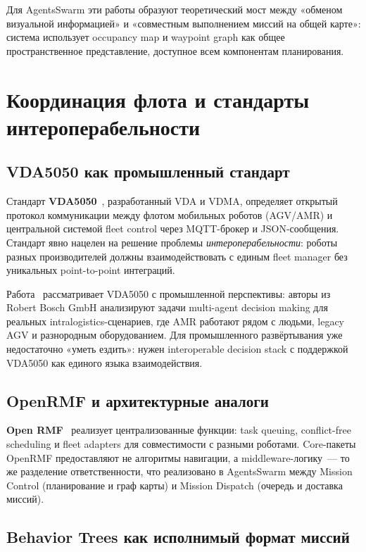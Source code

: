 \documentclass[14pt,a4paper]{extreport}
\begin{document}
Для AgentsSwarm эти работы образуют теоретический мост между «обменом визуальной информацией» и «совместным выполнением миссий на общей карте»: система использует occupancy map и waypoint graph как общее пространственное представление, доступное всем компонентам планирования.

\section{Координация флота и стандарты интероперабельности}

\subsection{VDA5050 как промышленный стандарт}

Стандарт \textbf{VDA5050}~\cite{vda5050}, разработанный VDA и VDMA, определяет открытый протокол коммуникации между флотом мобильных роботов (AGV/AMR) и центральной системой fleet control через MQTT-брокер и JSON-сообщения. Стандарт явно нацелен на решение проблемы \textit{интероперабельности}: роботы разных производителей должны взаимодействовать с единым fleet manager без уникальных point-to-point интеграций.

Работа~\cite{vanduijkeren2023} рассматривает VDA5050 с промышленной перспективы: авторы из Robert Bosch GmbH анализируют задачи multi-agent decision making для реальных intralogistics-сценариев, где AMR работают рядом с людьми, legacy AGV и разнородным оборудованием. Для промышленного развёртывания уже недостаточно «уметь ездить»: нужен interoperable decision stack с поддержкой VDA5050 как единого языка взаимодействия.

\subsection{OpenRMF и архитектурные аналоги}

\textbf{Open RMF}~\cite{openrmf} реализует централизованные функции: task queuing, conflict-free scheduling и fleet adapters для совместимости с разными роботами. Core-пакеты OpenRMF предоставляют не алгоритмы навигации, а middleware-логику~--- то же разделение ответственности, что реализовано в AgentsSwarm между Mission Control (планирование и граф карты) и Mission Dispatch (очередь и доставка миссий).

\subsection{Behavior Trees как исполнимый формат миссий}
\end{document}
